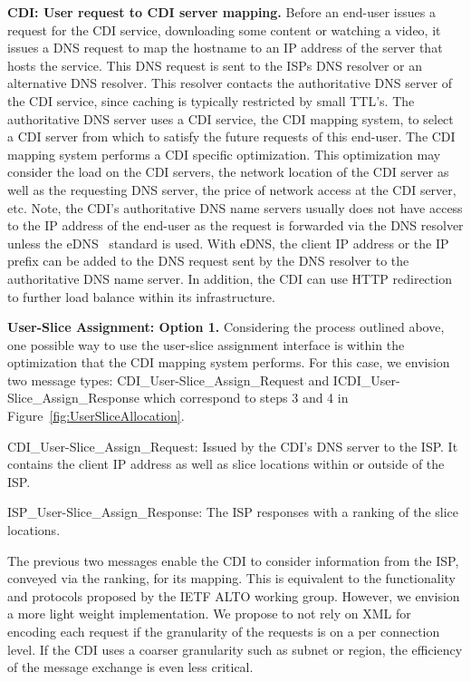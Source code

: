 {\bf CDI: User request to CDI server mapping.} Before an end-user issues a
request for the CDI service, \eg downloading some content or watching a video,
it issues a DNS request to map the hostname to an IP address of the server that
hosts the service.  This DNS request is sent to the ISPs DNS resolver or an
alternative DNS resolver. This resolver contacts the authoritative DNS server
of the CDI service, since caching is typically restricted by small TTL's. The
authoritative DNS server uses a CDI service, the CDI mapping system, to select
a CDI server from which to satisfy the future requests of this end-user. The
CDI mapping system performs a CDI specific optimization.  This optimization may
consider the load on the CDI servers, the network location of the CDI server as
well as the requesting DNS server, the price of network access at the CDI
server, etc. Note, the CDI's authoritative DNS name servers usually does not
have access to the IP address of the end-user as the request is forwarded via
the DNS resolver unless the eDNS~\cite{DNS-extension-IP-client} standard is
used.  With eDNS, the client IP address or the IP prefix can be added to the
DNS request sent by the DNS resolver to the authoritative DNS name server. In
addition, the CDI can use HTTP redirection to further load balance within its
infrastructure.


{\bf User-Slice Assignment: Option 1.} Considering the process outlined above,
one possible way to use the user-slice assignment interface is within the
optimization that the CDI mapping system performs.  For this case, we envision
two message types: CDI\_User-Slice\_Assign\_Re\-quest and
ICDI\_User-Slice\_Assign\_Response which correspond to steps 3 and 4 in
Figure~\ref{fig:UserSliceAllocation}.


\begin{description*}

\item [CDI\_User-Slice\_Assign\_Request:] Issued by the CDI's DNS server to the
  ISP. It contains the client IP address as well as slice locations within or
  outside of the ISP.

\item [ISP\_User-Slice\_Assign\_Response:] The ISP responses with a ranking of
  the slice locations.

\end{description*}

The previous two messages enable the CDI to consider information from the ISP,
conveyed via the ranking, for its mapping. This is equivalent to the
functionality and protocols proposed by the IETF ALTO working group.  However,
we envision a more light weight implementation. We propose to not rely on XML
for encoding each request if the granularity of the requests is on a per
connection level. If the CDI uses a coarser granularity such as subnet or
region, the efficiency of the message exchange is even less critical.\\

